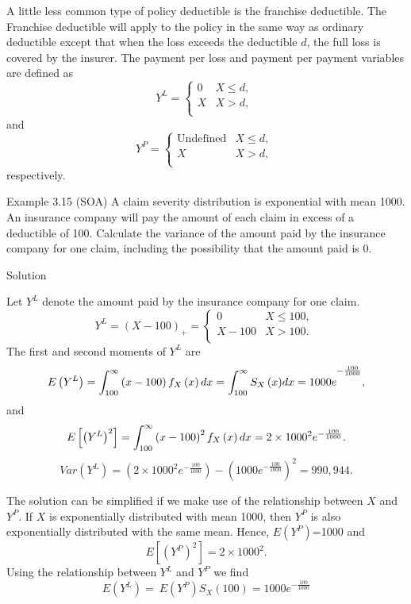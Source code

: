 \documentclass[]{book}
\theoremstyle{definition}
\theoremstyle{definition}
\theoremstyle{definition}
\theoremstyle{remark}
\begin{document}
A little less common type of policy deductible is the franchise
deductible. The Franchise deductible will apply to the policy in the
same way as ordinary deductible except that when the loss exceeds the
deductible \(d\), the full loss is covered by the insurer. The payment
per loss and payment per payment variables are defined as
\[Y^{L} = \left\{ \begin{matrix}
0 & X \leq d, \\
X & X > d, \\
\end{matrix} \right.\ \] and \[Y^{P} = \left\{ \begin{matrix}
\text{Undefined} & X \leq d, \\
X & X > d, \\
\end{matrix} \right.\ \] respectively.

Example 3.15 (SOA) A claim severity distribution is exponential with
mean 1000. An insurance company will pay the amount of each claim in
excess of a deductible of 100. Calculate the variance of the amount paid
by the insurance company for one claim, including the possibility that
the amount paid is 0.

Solution

Let \(Y^{L}\) denote the amount paid by the insurance company for one
claim. \[Y^{L} = \left( X - 100 \right)_{+} = \left\{ \begin{matrix}
0 & X \leq 100, \\
X - 100 & X > 100. \\
\end{matrix} \right.\ \] The first and second moments of \(Y^{L}\) are
\[E\left( Y^{L} \right) = \int_{100}^{\infty}\left( x - 100 \right)f_{X}\left( x \right)dx \\
= {\int_{100}^{\infty}{S_{X}\left( x \right)}dx = 1000e}^{- \frac{100}{1000}},\]
and
\[E\left\lbrack \left( Y^{L} \right)^{2} \right\rbrack = \int_{100}^{\infty}\left( x - 100 \right)^{2}f_{X}\left( x \right)dx \\
= 2 \times 1000^{2}e^{- \frac{100}{1000}}.\]
\[Var\left( Y^{L} \right) = \left( 2 \times 1000^{2}e^{- \frac{100}{1000}} \right) - \left( {1000e}^{- \frac{100}{1000}} \right)^{2} = 990,944.\]

The solution can be simplified if we make use of the relationship
between \(X\) and \(Y^{P}\). If \(X\) is exponentially distributed with
mean 1000, then \(Y^{P}\) is also exponentially distributed with the
same mean. Hence, \(E\left( Y^{P} \right)\)=1000 and
\[E\left\lbrack \left( Y^{P} \right)^{2} \right\rbrack = 2 \times 1000^{2}.\]
Using the relationship between \(Y^{L}\) and \(Y^{P}\) we find
\[E\left( Y^{L} \right) = \ E\left( Y^{P} \right)S_{X}\left( 100 \right){= 1000e}^{- \frac{100}{1000}}\]
\end{document}
